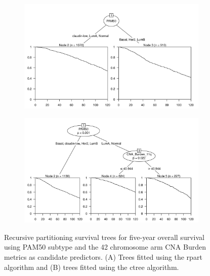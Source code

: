 \begin{figure}[!htb]
\centering

\vspace{0.5cm}

\begin{subfigure}{\textwidth}
\subcaption{}
\includegraphics[width=1\textwidth]{../figures/Appendices/Appendix_B/PA_PartyKit_Survival_Burden_TenYearOS_PAM50.png}
\end{subfigure}

\vspace{2cm}

\begin{subfigure}{\textwidth}
\subcaption{}
\includegraphics[width=1\textwidth]{../figures/Appendices/Appendix_B/PA_Ctree_Survival_Burden_TenYearOS_PAM50.png}
\end{subfigure}

\vspace{0.5cm}

\caption[Recursive partitioning survival trees for five-year overall survival using PAM50 subtype and the 42 chromosome arm CNA Burden metrics as candidate predictors.]{Recursive partitioning survival trees for five-year overall survival using PAM50 subtype and the 42 chromosome arm CNA Burden metrics as candidate predictors. (A) Trees fitted using the rpart algorithm and (B) trees fitted using the ctree algorithm.}
\end{figure}

